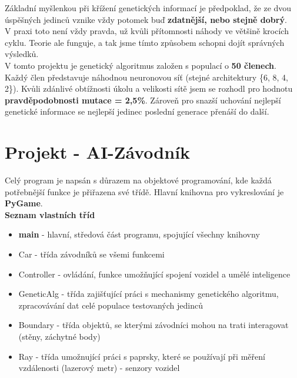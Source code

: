 \documentclass[a4paper,12pt]{article}
\newcommand{\tab}
{
    \hspace*{1em}
}
\begin{document}
        \vspace{0.75cm}
        Základní myšlenkou při křížení genetických informací je předpoklad, že ze dvou úspěšných
        jedinců vznike vždy potomek buď \textbf{zdatnější, nebo stejně dobrý}.\\
        V praxi toto není vždy pravda, už kvůli přítomnosti náhody ve většině krocích cyklu. 
        Teorie ale funguje, a tak jsme tímto způsobem schopni dojít správných výsledků.
        \\

        V tomto projektu je genetický algoritmus založen s populací o \textbf{50 členech}. 
        Každý člen představuje náhodnou neuronovou síť (stejné architektury \{6, 8, 4, 2\}).
        Kvůli zdánlivé obtížnosti úkolu a velikosti sítě jsem se rozhodl pro hodnotu 
        \textbf{pravděpodobnosti mutace = 2,5\%}. Zároveň pro snazší uchování nejlepší 
        genetické informace se nejlepší jedinec poslední generace přenáší do další.

    \pagebreak
    \section{Projekt - AI-Závodník}
        \tab Celý program je napsán s důrazem na objektové programování, kde každá potřebnější funkce 
        je přiřazena své třídě. Hlavní knihovna pro vykreslování je \textbf{PyGame}.
        \\

        \textbf{Seznam vlastních tříd}
        \begin{itemize}[noitemsep]
            \vspace{-0.5em}
            \item \textbf{main} - hlavní, středová část programu, spojující všechny knihovny
            \item Car - třída závodníků se všemi funkcemi
            \item Controller - ovládání, funkce umožňující spojení vozidel a umělé inteligence
            \item GeneticAlg - třída zajišťující práci s mechanismy genetického algoritmu,
                zpracovávání dat celé populace testovaných jedinců
            \item Boundary - třída objektů, se kterými závodníci mohou na trati interagovat (stěny, záchytné body)
            \item Ray - třída umožnující práci s paprsky, které se používají při měření vzdálenosti
                (lazerový metr) - senzory vozidel
        \end{itemize}
\end{document}
